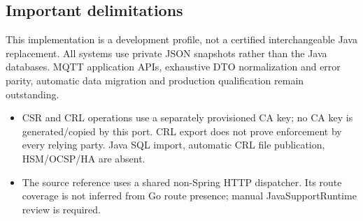 \documentclass[a4paper]{arrowhead}
\begin{document}
\subsection{Important delimitations}
This implementation is a development profile, not a certified interchangeable Java replacement. All systems use private JSON snapshots rather than the Java databases. MQTT application APIs, exhaustive DTO normalization and error parity, automatic data migration and production qualification remain outstanding.
\begin{itemize}
\item CSR and CRL operations use a separately provisioned CA key; no CA key is generated/copied by this port. CRL export does not prove enforcement by every relying party. Java SQL import, automatic CRL file publication, HSM/OCSP/HA are absent.
\item The source reference uses a shared non-Spring HTTP dispatcher. Its route coverage is not inferred from Go route presence; manual JavaSupportRuntime review is required.
\end{itemize}
\end{document}
